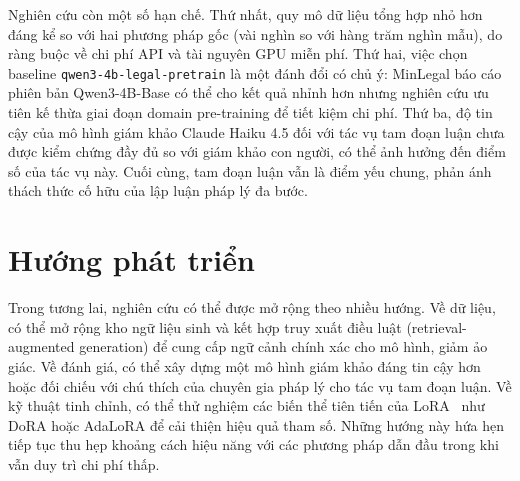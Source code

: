 Nghiên cứu còn một số hạn chế. Thứ nhất, quy mô dữ liệu tổng hợp nhỏ hơn đáng kể so với hai phương pháp gốc (vài nghìn so với hàng trăm nghìn mẫu), do ràng buộc về chi phí API và tài nguyên GPU miễn phí. Thứ hai, việc chọn baseline \texttt{qwen3-4b-legal-pretrain} là một đánh đổi có chủ ý: MinLegal báo cáo phiên bản Qwen3-4B-Base có thể cho kết quả nhỉnh hơn nhưng nghiên cứu ưu tiên kế thừa giai đoạn domain pre-training để tiết kiệm chi phí. Thứ ba, độ tin cậy của mô hình giám khảo Claude Haiku 4.5 đối với tác vụ tam đoạn luận chưa được kiểm chứng đầy đủ so với giám khảo con người, có thể ảnh hưởng đến điểm số của tác vụ này. Cuối cùng, tam đoạn luận vẫn là điểm yếu chung, phản ánh thách thức cố hữu của lập luận pháp lý đa bước.

\section*{Hướng phát triển}

Trong tương lai, nghiên cứu có thể được mở rộng theo nhiều hướng. Về dữ liệu, có thể mở rộng kho ngữ liệu sinh và kết hợp truy xuất điều luật (retrieval-augmented generation) để cung cấp ngữ cảnh chính xác cho mô hình, giảm ảo giác. Về đánh giá, có thể xây dựng một mô hình giám khảo đáng tin cậy hơn hoặc đối chiếu với chú thích của chuyên gia pháp lý cho tác vụ tam đoạn luận. Về kỹ thuật tinh chỉnh, có thể thử nghiệm các biến thể tiên tiến của LoRA~\cite{hu2022lora} như DoRA hoặc AdaLoRA để cải thiện hiệu quả tham số. Những hướng này hứa hẹn tiếp tục thu hẹp khoảng cách hiệu năng với các phương pháp dẫn đầu trong khi vẫn duy trì chi phí thấp.

